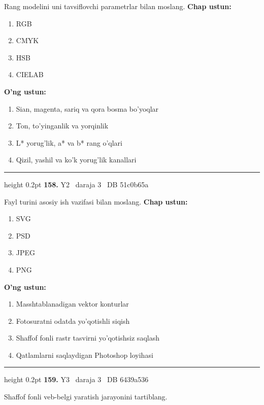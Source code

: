 \documentclass[10pt,a4paper,oneside]{article}
\begin{document}
Rang modelini uni tavsiflovchi parametrlar bilan moslang.
\textbf{\footnotesize Chap ustun:}
\begin{enumerate}[label=\arabic*),leftmargin=9mm]
\item RGB
\item CMYK
\item HSB
\item CIELAB
\end{enumerate}
\textbf{\footnotesize O'ng ustun:}
\begin{enumerate}[label=\Alph*),leftmargin=9mm]
\item Sian, magenta, sariq va qora bosma bo'yoqlar
\item Ton, to'yinganlik va yorqinlik
\item L* yorug'lik, a* va b* rang o'qlari
\item Qizil, yashil va ko'k yorug'lik kanallari
\end{enumerate}
\vspace{2mm}\hrule height 0.2pt \vspace{4mm}
\hypertarget{q158}{\textbf{\color{ink}158.}}  {\color{muted}\scriptsize Y2 \textbullet\ daraja 3 \textbullet\ DB 51c0b65a}
\par
Fayl turini asosiy ish vazifasi bilan moslang.
\textbf{\footnotesize Chap ustun:}
\begin{enumerate}[label=\arabic*),leftmargin=9mm]
\item SVG
\item PSD
\item JPEG
\item PNG
\end{enumerate}
\textbf{\footnotesize O'ng ustun:}
\begin{enumerate}[label=\Alph*),leftmargin=9mm]
\item Masshtablanadigan vektor konturlar
\item Fotosuratni odatda yo'qotishli siqish
\item Shaffof fonli rastr tasvirni yo'qotishsiz saqlash
\item Qatlamlarni saqlaydigan Photoshop loyihasi
\end{enumerate}
\vspace{2mm}\hrule height 0.2pt \vspace{4mm}
\hypertarget{q159}{\textbf{\color{ink}159.}}  {\color{muted}\scriptsize Y3 \textbullet\ daraja 3 \textbullet\ DB 6439a536}
\par
Shaffof fonli veb-belgi yaratish jarayonini tartiblang.
\end{document}

